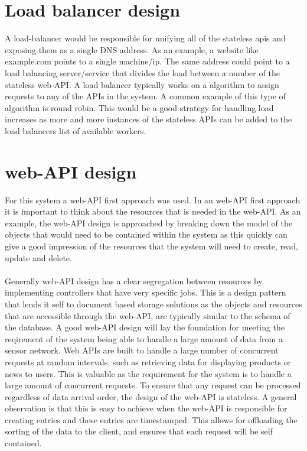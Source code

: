 \documentclass[]{uiophd}
\begin{document}
\section{Load balancer design}
A load-balancer would be responsible for unifying all of the stateless apis and exposing them as a single DNS address. As an example, a website like example.com points to a single machine/ip. The same address could point to a load balancing server/service that divides the load between a number of the stateless web-API. A load balancer typically works on a algorithm to assign requests to any of the APIs in the system. A common example of this type of algorithm is round robin. This would be a good strategy for handling load increases as more and more instances of the stateless APIs can be added to the load balancers list of available workers.

\section{web-API design}
For this system a web-API first approach was used. In an web-API first approach it is important to think about the resources that is needed in the web-API. As an example, the web-API design is approached by breaking down the model of the objects that would need to be contained within the system as this quickly can give a good impression of the resources that the system will need to create, read, update and delete. 
\\\\
Generally web-API design has a clear segregation between resources by implementing controllers that have very specific jobs. This is a design pattern that lends it self to document based storage solutions as the objects and resources that are accessible through the web-API, are typically similar to the schema of the database. A good web-API design will lay  the foundation for meeting the reqirement of the system being able to handle a large amount of data from a sensor network. Web APIs are built to handle a large number of concurrent requests at random intervals, such as retrieving data for displaying products or news to users. This is valuable as the requirement for the system is to handle a large amount of concurrent requests. To ensure that any request can be processed regardless of data arrival order, the design of the web-API is stateless. A general observation is that this is easy to achieve when the web-API is responsible for creating entries and these entries are timestamped. This allows for offloading the sorting of the data to the client, and ensures that each request will be self contained.
\end{document}
